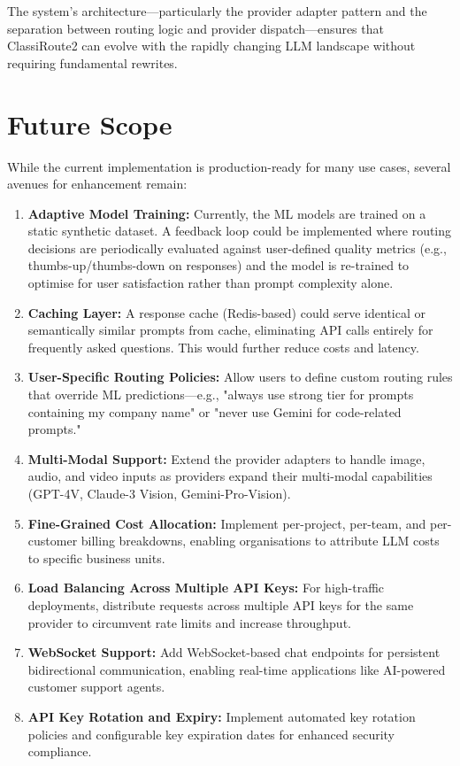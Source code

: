 \documentclass[12pt,a4paper]{report}
\begin{document}
The system's architecture---particularly the provider adapter pattern and the separation between routing logic and provider dispatch---ensures that ClassiRoute2 can evolve with the rapidly changing LLM landscape without requiring fundamental rewrites.

\section{Future Scope}

While the current implementation is production-ready for many use cases, several avenues for enhancement remain:

\begin{enumerate}[nosep]
    \item \textbf{Adaptive Model Training:} Currently, the ML models are trained on a static synthetic dataset. A feedback loop could be implemented where routing decisions are periodically evaluated against user-defined quality metrics (e.g., thumbs-up/thumbs-down on responses) and the model is re-trained to optimise for user satisfaction rather than prompt complexity alone.
    \item \textbf{Caching Layer:} A response cache (Redis-based) could serve identical or semantically similar prompts from cache, eliminating API calls entirely for frequently asked questions. This would further reduce costs and latency.
    \item \textbf{User-Specific Routing Policies:} Allow users to define custom routing rules that override ML predictions---e.g., "always use strong tier for prompts containing my company name" or "never use Gemini for code-related prompts."
    \item \textbf{Multi-Modal Support:} Extend the provider adapters to handle image, audio, and video inputs as providers expand their multi-modal capabilities (GPT-4V, Claude-3 Vision, Gemini-Pro-Vision).
    \item \textbf{Fine-Grained Cost Allocation:} Implement per-project, per-team, and per-customer billing breakdowns, enabling organisations to attribute LLM costs to specific business units.
    \item \textbf{Load Balancing Across Multiple API Keys:} For high-traffic deployments, distribute requests across multiple API keys for the same provider to circumvent rate limits and increase throughput.
    \item \textbf{WebSocket Support:} Add WebSocket-based chat endpoints for persistent bidirectional communication, enabling real-time applications like AI-powered customer support agents.
    \item \textbf{API Key Rotation and Expiry:} Implement automated key rotation policies and configurable key expiration dates for enhanced security compliance.
\end{enumerate}
\end{document}
